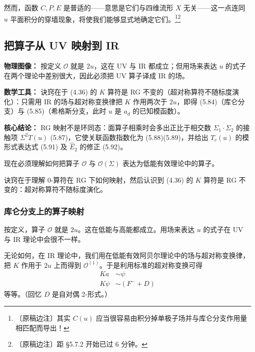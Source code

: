 然而，函数 $C,P,E$ 是普适的——意思是它们与四维流形 $X$ 无关——这一点连同 $u$ 平面积分的穿墙现象，将使我们能够显式地确定它们。\footnote{〔原稿边注〕其实 $C(u)$ 应当很容易由积分掉单极子场并与库仑分支作用量相匹配而导出！}\footnote{〔原稿边注〕距 §5.7.2 开始已过 6 分钟。}

\subsection{把算子从 UV 映射到 IR}

\begin{keytakeaways}
\item \textbf{物理图像：} 按定义 $\mathcal{O}$ 就是 $2u$，这在 UV 与 IR 都成立；但用场来表达 $u$ 的式子在两个理论中差别很大，因此必须把 UV 算子译成 IR 的场。
\item \textbf{数学工具：} 诀窍在于 (4.36) 的 $K$ 算符是 RG 不变的（超对称算符不随标度演化）：只需用 IR 的场与超对称变换律把 $K$ 作用两次于 $2u$，即得 (5.84)（库仑分支）与 (5.85)（希格斯分支，此时 $u$ 是 $a_{d}$ 的已知模函数）。
\item \textbf{核心结论：} RG 映射不是环同态：面算子相乘时会多出正比于相交数 $\Sigma_{1}\cdot\Sigma_{2}$ 的接触项 $\Sigma^{2}T(u)$ (5.87)，它使关联函数指数化为 (5.88)(5.89)，并给出 $T_{c}(u)$ 的模形式表达式 (5.91) 及 $\hat E_{2}$ 的修正 (5.92)。
\end{keytakeaways}

现在必须理解如何把算子 $\mathcal{O}$ 与 $\mathcal{O}(\Sigma)$ 表达为低能有效理论中的算子。

诀窍在于理解 0-算符在 RG 下如何映射，然后认识到 (4.36) 的 $K$ 算符是 RG 不变的：超对称算符不随标度演化。

\subsubsection{库仑分支上的算子映射}

按定义，算子 $\mathcal{O}$ 就是 $2u$。这在低能与高能都成立。用场来表达 $u$ 的式子在 UV 与 IR 理论中会很不一样。

无论如何，在 IR 理论中，我们用在低能有效阿贝尔理论中的场与超对称变换律，把 $K$ 作用于 $2u$ 上而得到 $\mathcal{O}^{(1)}$。于是利用标准的超对称变换可得
\begin{equation}
\begin{aligned}
Ka&\sim\psi\\
K\psi&\sim(F^{-}+D)
\end{aligned}
\tag{5.83}
\end{equation}
等等。（回忆 $D$ 是自对偶 2-形式。）


